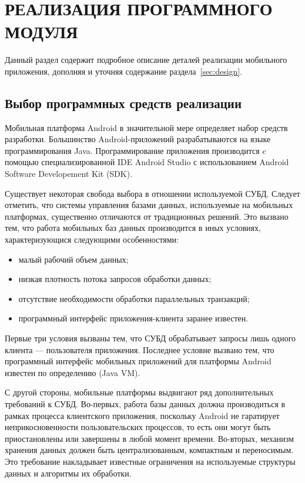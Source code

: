 \section[Реализация программного модуля]{%
  РЕАЛИЗАЦИЯ ПРОГРАММНОГО МОДУЛЯ
}\label{sec:implementation}

Данный раздел содержит подробное описание деталей реализации
мобильного приложения, дополняя и уточняя
содержание раздела~\ref{sec:design}.

\subsection{Выбор программных средств реализации}

Мобильная платформа Android в значительной мере
определяет набор средств разработки. Большинство Android-приложений
разрабатываются на языке программирования Java. Программирование
приложения производится c помощью специализированной
IDE Android Studio с использованием Android Software Developement Kit (SDK).

Существует некоторая свобода выбора в отношении используемой СУБД.
Следует отметить, что системы управления базами данных,
используемые на мобильных платформах, существенно отличаются
от традиционных решений.
Это вызвано тем, что работа мобильных баз данных производится в
иных условиях, характеризующися следующими особенностями:
\begin{itemize}
  \item малый рабочий объем данных;
  \item низкая плотность потока запросов обработки данных;
  \item отсутствие необходимости обработки параллельных транзакций;
  \item программный интерфейс приложения-клиента заранее известен.
\end{itemize}

Первые три условия вызваны тем, что СУБД обрабатывает запросы
лишь одного клиента --- пользователя приложения.
Последнее условие вызвано тем, что программный интерфейс мобильных
приложений для платформы Android известен по определению (Java VM).

С другой стороны, мобильные платформы выдвигают ряд
дополнительных требований к СУБД.
Во-первых, работа базы данных должна производиться в рамках
процесса клиентского приложения, поскольку Android не гаратирует
неприкосновенности пользовательских процессов, то есть они могут быть
приостановлены или завершены в любой момент времени.
Во-вторых, механизм хранения данных должен быть централизованным,
компактным и переносимым. Это требование накладывает
известные ограничения на используемые структуры данных
и алгоритмы их обработки.

